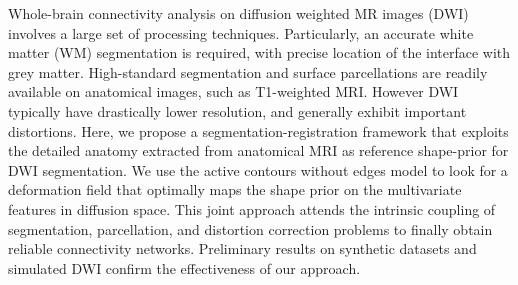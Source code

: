 Whole-brain connectivity analysis on diffusion weighted MR images (DWI) involves
a large set of processing techniques. Particularly, an accurate white matter (WM)
segmentation is required, with precise location of the interface with grey matter.
High-standard segmentation and surface parcellations are readily available on 
anatomical images, such as T1-weighted MRI. However DWI typically have drastically 
lower resolution, and generally exhibit important distortions. Here, we propose a 
segmentation-registration framework that exploits the detailed anatomy extracted 
from anatomical MRI as reference shape-prior for DWI segmentation. We use the 
active contours without edges model to look for a deformation field that optimally 
maps the shape prior on the multivariate features in diffusion space. This joint
approach attends the intrinsic coupling of segmentation, parcellation, and distortion 
correction problems to finally obtain reliable connectivity networks. Preliminary
results on synthetic datasets and simulated DWI confirm the effectiveness of our 
approach.
